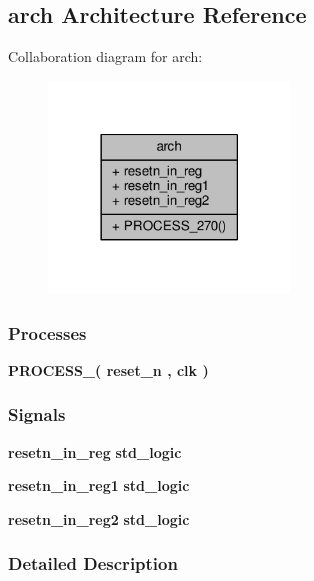 \subsection{arch Architecture Reference}
\label{classrstn__pulse_1_1arch}


Collaboration diagram for arch\+:\nopagebreak
\begin{figure}[H]
\begin{center}
\leavevmode
\includegraphics[width=182pt]{d1/db2/classrstn__pulse_1_1arch__coll__graph}
\end{center}
\end{figure}
\subsubsection*{Processes}
 \begin{DoxyCompactItemize}
\item 
{\bf P\+R\+O\+C\+E\+S\+S\+\_}{\bfseries  ( {\bfseries {\bfseries {\bf reset\+\_\+n}} \textcolor{vhdlchar}{ }} , {\bfseries {\bfseries {\bf clk}} \textcolor{vhdlchar}{ }} )}
\end{DoxyCompactItemize}
\subsubsection*{Signals}
 \begin{DoxyCompactItemize}
\item 
{\bf resetn\+\_\+in\+\_\+reg} {\bfseries \textcolor{comment}{std\+\_\+logic}\textcolor{vhdlchar}{ }} 
\item 
{\bf resetn\+\_\+in\+\_\+reg1} {\bfseries \textcolor{comment}{std\+\_\+logic}\textcolor{vhdlchar}{ }} 
\item 
{\bf resetn\+\_\+in\+\_\+reg2} {\bfseries \textcolor{comment}{std\+\_\+logic}\textcolor{vhdlchar}{ }} 
\end{DoxyCompactItemize}


\subsubsection{Detailed Description}


